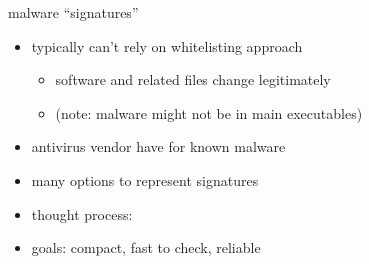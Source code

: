
\begin{frame}{malware ``signatures''}
    \begin{itemize}
    \item typically can't rely on whitelisting approach
        \begin{itemize}
        \item software and related files change legitimately
        \item (note: malware might not be in main executables)
        \end{itemize}
    \vspace{.5cm}
    \item antivirus vendor have  for known malware
    \item many options to represent signatures
    \item thought process: 
    \vspace{.5cm}
    \item goals: compact, fast to check, reliable
    \end{itemize}
\end{frame}

